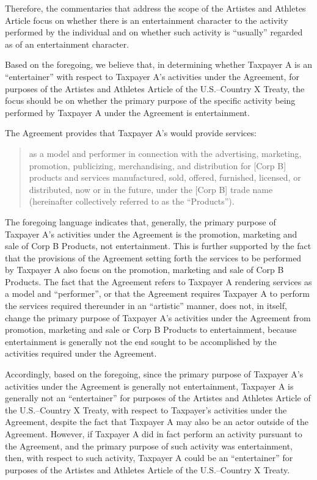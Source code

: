 \begin{select}
Therefore, the commentaries that address the scope of the Artistes and Athletes
Article focus on whether there is an entertainment character to the activity
performed by the individual and on whether such activity is ``usually'' regarded as of
an entertainment character. 

Based on the foregoing, we believe that, in determining whether Taxpayer A
is an ``entertainer'' with respect to Taxpayer A's activities under the Agreement, for
purposes of the Artistes and Athletes Article of the U.S.--Country X Treaty, the focus
should be on whether the primary purpose of the specific activity being performed
by Taxpayer A under the Agreement is entertainment. 

The Agreement provides that Taxpayer A's would provide services:

\begin{quotation}

as a model and performer in connection with the advertising, marketing,
promotion, publicizing, merchandising, and distribution for [Corp B] products
and services manufactured, sold, offered, furnished, licensed, or distributed,
now or in the future, under the [Corp B] trade name (hereinafter collectively
referred to as the ``Products'').
\end{quotation}
The foregoing language indicates that, generally, the primary purpose of Taxpayer
A's activities under the Agreement is the promotion, marketing and sale of Corp B
Products, not entertainment. This is further supported by the fact that the
provisions of the Agreement setting forth the services to be performed by Taxpayer
A also focus on the promotion, marketing and sale of Corp B Products. The fact
that the Agreement refers to Taxpayer A rendering services as a model and
``performer'', or that the Agreement requires Taxpayer A to perform the services
required thereunder in an ``artistic'' manner, does not, in itself, change the primary
purpose of Taxpayer A's activities under the Agreement from promotion, marketing
and sale or Corp B Products to entertainment, because entertainment is generally
not the end sought to be accomplished by the activities required under the
Agreement.

Accordingly, based on the foregoing, since the primary purpose of Taxpayer
A's activities under the Agreement is generally not entertainment, Taxpayer A is
generally not an ``entertainer'' for purposes of the Artistes and Athletes Article of the
U.S.--Country X Treaty, with respect to Taxpayer's activities under the Agreement,
despite the fact that Taxpayer A may also be an actor outside of the Agreement. 
However, if Taxpayer A did in fact perform an activity pursuant to the Agreement,
and the primary purpose of such activity was entertainment, then, with respect to
such activity, Taxpayer A could be an ``entertainer'' for purposes of the Artistes and
Athletes Article of the U.S.--Country X Treaty.


\end{select}
